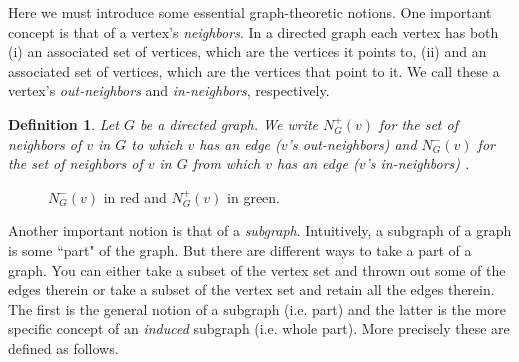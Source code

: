 \documentclass[12pt]{article}
\newtheorem{defn}{Definition}
\theoremstyle{remark}
\begin{document}
Here we must introduce some essential graph-theoretic notions. One important concept is that of a vertex's \textit{neighbors}. In a directed graph each vertex has both (i) an associated set of vertices, which are the vertices it points to, (ii) and an associated set of vertices, which are the vertices that point to it. We call these a vertex's \textit{out-neighbors} and \textit{in-neighbors}, respectively.

\begin{defn}
Let $G$ be a directed graph.  We write $N^{+}_G(v)$ for the set of neighbors of $v$ in $G$ to which $v$ has an edge ($v$'s out-neighbors) and $N^{-}_G(v)$ for the set of neighbors of $v$ in $G$ from which $v$ has an edge ($v$'s in-neighbors) .
\end{defn}

\begin{figure}[ht]
\centering
{}
\caption{$N^{-}_G(v)$ in red and $N^{+}_G(v)$ in green.}
\end{figure}

Another important notion is that of a \textit{subgraph}. Intuitively, a subgraph of a graph is some ``part" of the graph. But there are different ways to take a part of a graph. You can either take a subset of the vertex set and thrown out some of the edges therein or take a subset of the vertex set and retain all the edges therein. The first is the general notion of a subgraph (i.e. part) and the latter is the more specific concept of an \textit{induced} subgraph (i.e. whole part). More precisely these are defined as follows.
\end{document}
